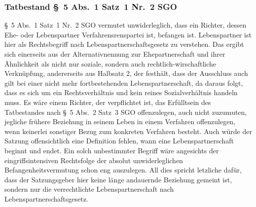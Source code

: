 \subsubsection{Tatbestand \S~5 Abs.~1 Satz~1 Nr.~2 SGO}
\label{Zusammensetzung:Spruchkoerper:Befangenheitsvermutung:Nr2}
\S~5 Abs.~1 Satz~1 Nr.~2 SGO vermutet unwiderleglich, dass ein Richter, dessen Ehe- oder Lebenspartner Verfahrensrenspartei ist, befangen ist.
Lebenspartner ist hier als Rechtsbegriff nach Lebenspartnerschaftsgesetz zu verstehen.
Das ergibt sich einerseits aus der Alternativnennung zur Ehepartnerschaft und ihrer Ähnlichkeit als nicht nur soziale, sondern auch rechtlich-wirschaftliche Verknüpfung, andererseits aus Halbsatz 2, der festhält, dass der Ausschluss auch gilt bei einer nicht mehr fortbestehenden Lebenspartnerschaft, da daraus folgt, dass es sich um ein Rechtsverhältnis und kein reines Sozialverhältnis handeln muss.
Es wäre einem Richter, der verpflichtet ist, das Erfülltsein des Tatbestandes nach \S~5 Abs.~2 Satz~3 SGO offenzulegen, auch nicht zuzumuten, jegliche frühere Beziehung in seinem Leben in einem Verfahren offenzulegen, wenn keinerlei sonstiger Bezug zum konkreten Verfahren besteht.
Auch würde der Satzung offensichtlich eine Definition fehlen, wann eine Lebenspartnerschaft beginnt und endet.
Ein solch unbestimmter Begriff wäre angesichts der eingriffsintensiven Rechtsfolge der absolut unwiderleglichen Befangenheitsvermutung schon eng auszulegen.
All dies spricht letzliche dafür, dass der Satzungsgeber hier keine länge andauernde Beziehung gemeint ist, sondern nur die verrechtlichte Lebenspartnerschaft nach Lebenspartnerschaftsgesetz.

